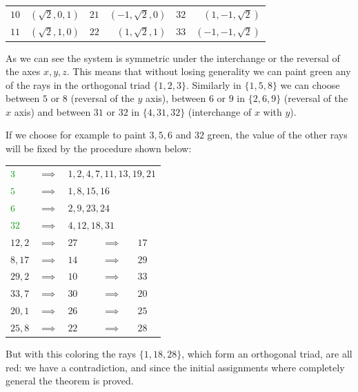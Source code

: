 \documentclass[a4paper]{article}
\newcommand{\red}[1]{\textcolor{dred}{#1}}
\newcommand{\green}[1]{\textcolor{dgreen}{#1}}
\theoremstyle{definition}
\let\oldproof\proof
\let\oldendproof\endproof
\renewenvironment{proof}
    {
        \begin{framed} 
        \oldproof
    }
    {
        \oldendproof 
        \end{framed}
    }
\begin{document}
\begin{proof}
\begin{center}
\begin{tabular}{lrlrlr}
        $10$ & $(\sqrt{2}, 0, 1)$ & $21$ & $(-1, \sqrt{2}, 0)$  & $32$ & $(1,-1, \sqrt{2})$ \\
        $11$ & $(\sqrt{2}, 1, 0)$ & $22$ & $(1, \sqrt{2}, 1)$  & $33$ & $(-1,-1, \sqrt{2})$ \\
    \end{tabular}   
    \end{center}
    As we can see the system is symmetric under the interchange or the reversal
    of the axes $x,y,z$.
    This means that without losing generality we can paint green any of
    the rays in the orthogonal triad $\{1,2,3\}$.
    Similarly in $\{1,5,8\}$  we can choose between $5$ or $8$ (reversal of the
    $y$ axis), between $6$ or $9$ in $\{2,6,9\}$ (reversal of the $x$ axis)
     and between $31$ or $32$ in $\{4,31,32\}$ (interchange of $x$ with $y$).

    If we choose for example to paint $3,5,6$ and $32$ green, the value of the other rays
    will be fixed by the procedure shown below: \\
    \begin{center}
    \begin{tabular}{lclcl}
        $\green{3}$  & $\implies$ & \multicolumn{3}{l}{\red{$1, 2, 4, 7,11, 13, 19, 21$}}\\
        $\green{5}$  & $\implies$ & \multicolumn{3}{l}{\red{$1, 8, 15, 16$}} \\
        $\green{6}$  & $\implies$ & \multicolumn{3}{l}{\red{$2, 9, 23, 24$}} \\
        $\green{32}$ & $\implies$ & \multicolumn{3}{l}{\red{$4,12,18,31$}} \\
        \midrule
        \red{$12,2$} & $\implies$ & \green{$27$} & $\implies$ & \red{$17$} \\
        \red{$8,17$} & $\implies$ & \green{$14$} & $\implies$ & \red{$29$} \\
        \red{$29,2$} & $\implies$ & \green{$10$} & $\implies$ & \red{$33$} \\
        \red{$33,7$} & $\implies$ & \green{$30$} & $\implies$ & \red{$20$} \\
        \red{$20,1$} & $\implies$ & \green{$26$} & $\implies$ & \red{$25$} \\
        \red{$25,8$} & $\implies$ & \green{$22$} & $\implies$ & \red{$28$} \\
    \end{tabular}
    \end{center}
    
    But with this coloring the rays $\{1,18,28\}$, which form an orthogonal
    triad, are all red: we have a contradiction, and since the initial assignments where
    completely general the theorem is proved.
\end{proof}
\end{document}

